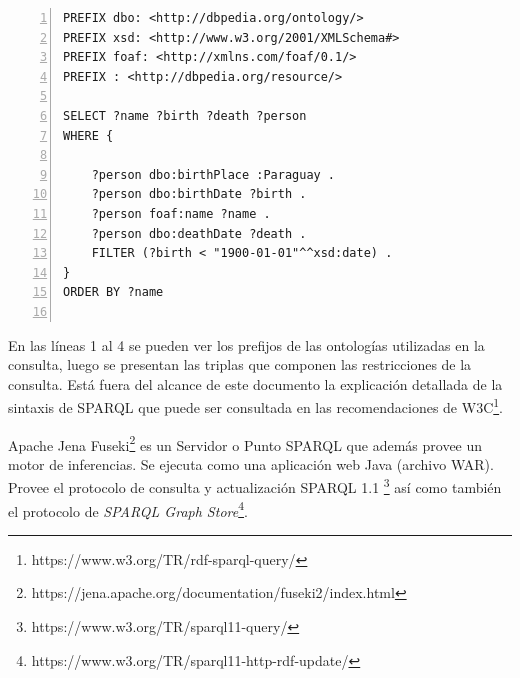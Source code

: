\lstset{
    language=MySPARQL
}

\noindent\begin{minipage}{\textwidth}
\begin{lstlisting}[captionpos=b, caption=Ejemplo de consulta SPARQL, label=lst:consulta-sparql,  numbers=left,  numberstyle=\tiny\color{mygray},frame=single]
PREFIX dbo: <http://dbpedia.org/ontology/>
PREFIX xsd: <http://www.w3.org/2001/XMLSchema#>
PREFIX foaf: <http://xmlns.com/foaf/0.1/>
PREFIX : <http://dbpedia.org/resource/>

SELECT ?name ?birth ?death ?person 
WHERE { 

    ?person dbo:birthPlace :Paraguay . 
    ?person dbo:birthDate ?birth . 
    ?person foaf:name ?name . 
    ?person dbo:deathDate ?death . 
    FILTER (?birth < "1900-01-01"^^xsd:date) . 
}
ORDER BY ?name
 
\end{lstlisting}
\end{minipage}

En las líneas 1 al 4 se pueden ver los prefijos de las ontologías utilizadas en la consulta, luego se presentan las triplas que componen las restricciones de la consulta. Está fuera del alcance de este documento la explicación detallada de la sintaxis de SPARQL que puede ser consultada en las recomendaciones de W3C\footnote{https://www.w3.org/TR/rdf-sparql-query/}.

Apache Jena Fuseki\footnote{https://jena.apache.org/documentation/fuseki2/index.html} es un Servidor o Punto SPARQL que además provee un motor de inferencias. Se ejecuta como una aplicación web Java (archivo WAR). Provee el protocolo de consulta y actualización SPARQL 1.1 \footnote{https://www.w3.org/TR/sparql11-query/} así como también el protocolo de \textit{SPARQL Graph Store}\footnote{https://www.w3.org/TR/sparql11-http-rdf-update/}.
